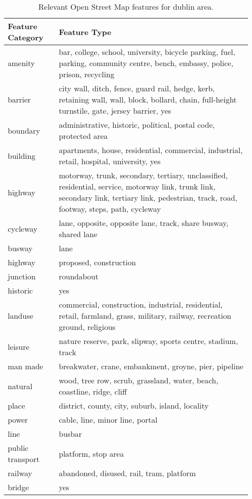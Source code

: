 \documentclass[]{elsarticle} %
\begin{document}
\begin{table}[t]

\caption{\label{tab:all_OSM_features}Relevant Open Street Map features for dublin area.}
\centering
\fontsize{8}{10}\selectfont
\begin{tabular}{l>{\raggedright\arraybackslash}p{3in}}
\toprule
Feature Category & Feature Type\\
\midrule
amenity & bar, college, school, university, bicycle parking, fuel, parking, community centre, bench, embassy, police, prison, recycling\\
barrier & city wall, ditch, fence, guard rail, hedge, kerb, retaining wall, wall, block, bollard, chain, full-height turnstile, gate, jersey barrier, yes\\
boundary & administrative, historic, political, postal code, protected area\\
building & apartments, house, residential, commercial, industrial, retail, hospital, university, yes\\
highway & motorway, trunk, secondary, tertiary, unclassified, residential, service, motorway link, trunk link, secondary link, tertiary link, pedestrian, track, road, footway, steps, path, cycleway\\
cycleway & lane, opposite, opposite lane, track, share busway, shared lane\\
busway & lane\\
highway & proposed, construction\\
junction & roundabout\\
historic & yes\\
landuse & commercial, construction, industrial, residential, retail, farmland, grass, military, railway, recreation ground, religious\\
leisure & nature reserve, park, slipway, sports centre, stadium, track\\
man made & breakwater, crane, embankment, groyne, pier, pipeline\\
natural & wood, tree row, scrub, grassland, water, beach, coastline, ridge, cliff\\
place & district, county, city, suburb, island, locality\\
power & cable, line, minor line, portal\\
line & busbar\\
public transport & platform, stop area\\
railway & abandoned, disused, rail, tram, platform\\
bridge & yes\\

\end{tabular}
\end{table}
\end{document}
